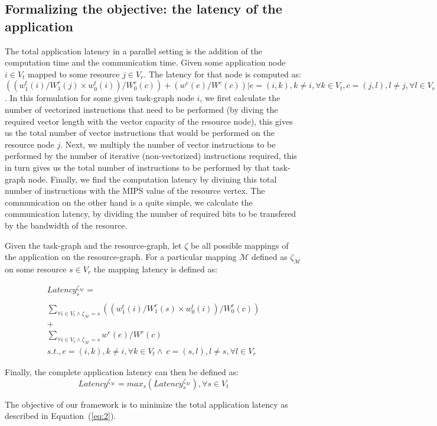 \subsection{Formalizing the objective: the latency of the application}
\label{sec:form-latency-appl}

The total application latency in a parallel setting is the addition of
the computation time and the communication time. Given some application
node $i \in V_t$ mapped to some resource $j \in V_r$. The latency for
that node is computed as: $((w^t_1(i)/W^r_1(j)\times
w^t_0(i))/W^r_0(c))+ (w^e(e)/W^c(c)) | e = (i,k), k \neq i, \forall k
\in V_t, c = (j,l), l \neq j, \forall l \in V_r $. In this formulation
for some given task-graph node $i$, we first calculate the number of
vectorized instructions that need to be performed (by diving the
required vector length with the vector capacity of the resource node),
this gives us the total number of vector instructions that would be
performed on the resource node $j$. Next, we multiply the number of
vector instructions to be performed by the number of iterative
(non-vectorized) instructions required, this in turn gives us the total
number of instructions to be performed by that task-graph node. Finally,
we find the computation latency by divining this total number of
instructions with the MIPS value of the resource vertex. The
communication on the other hand is a quite simple, we calculate the
communication latency, by dividing the number of required bits to be
transfered by the bandwidth of the resource.

Given the task-graph and the resource-graph, let $\zeta$ be all possible
mappings of the application on the resource-graph. For a particular
mapping $\mathcal{M}$ defined as $\zeta_\mathcal{M}$ on some resource $s
\in V_r$ the mapping latency is defined as:

\begin{equation}
  \begin{array}{c}
    Latency^{\zeta_\mathcal{M}}_s = \\
    \\
    \sum_{\forall i \in V_t \wedge
      \zeta_\mathcal{M} = s} ((w^t_1(i)/W^r_1(s)\times w^t_0(i))/W^r_0(c))
    \\
    +
    \\
    \sum_{\forall i \in V_t \wedge
      \zeta_\mathcal{M} = s} w^e(e) / W^c(c)\\ 
    s.t., e = (i,k), k \neq i, \forall k
    \in V_t \wedge\  c = (s,l), l \neq s, \forall l \in V_r
  \end{array}
  \label{eq:1}
\end{equation}

Finally, the complete application latency can then be defined as: 
\begin{equation}
  \label{eq:2}
  Latency^{\zeta_\mathcal{M}} = max_{s}
  ({Latency^{\zeta_\mathcal{M}}_s}), \forall s \in V_t
\end{equation}

The objective of our framework is to minimize the total application
latency as described in Equation~(\ref{eq:2}).

